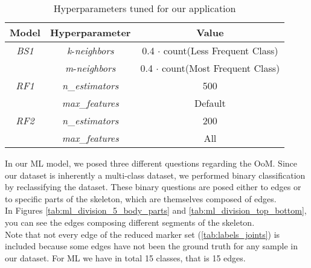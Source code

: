 \begin{table}[H]
    \centering
    \begin{tabular}{||c||c||c||}
        \hline
        \textbf{Model} & \textbf{Hyperparameter} & \textbf{Value} \\
        \hline
        \textit{BS1} & \textit{k}-\textit{neighbors} & 0.4 $\cdot$ count(Less Frequent Class)  \\
        & \textit{m}-\textit{neighbors} & 0.4 $\cdot$ count(Most Frequent Class)  \\
        \hline
        \textit{RF1} & \textit{n}\_\textit{estimators} & 500  \\
        & \textit{max}\_\textit{features} & Default  \\
        \hline
        \textit{RF2} & \textit{n}\_\textit{estimators} & 200  \\
        & \textit{max}\_\textit{features} & All  \\
        \hline
    \end{tabular}
    \caption{Hyperparameters tuned for our application}
    \label{tab:ml_param}
\end{table}

In our ML model, we posed three different questions regarding the OoM. 
Since our dataset is inherently a multi-class dataset, we performed binary classification by reclassifying the dataset.
These binary questions are posed either to edges or to specific parts of the skeleton, which are themselves composed of edges. \\
In Figures \ref{tab:ml_division_5_body_parts} and \ref{tab:ml_division_top_bottom}, you can see the edges composing different segments of the skeleton. \\
Note that not every edge of the reduced marker set (\ref{tab:labels_joints}) is included because some edges have not been the ground truth for any sample in our dataset.
For ML we have in total 15 classes, that is 15 edges.

